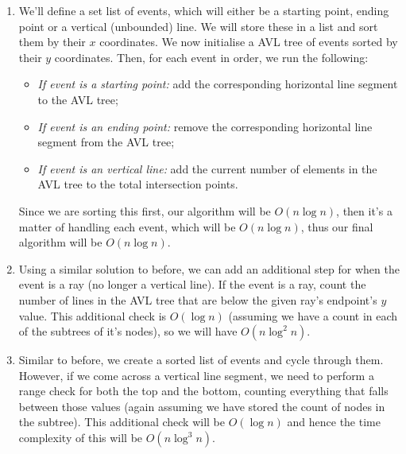 \documentclass{article}
\begin{document}
\begin{solution}
\begin{enumerate}[label = (\alph*)]
    \item We'll define a set list of events, which will either be a starting point, ending point or a vertical (unbounded) line. We will store these in a list and sort them by their $x$ coordinates. We now initialise a AVL tree of events sorted by their $y$ coordinates. Then, for each event in order, we run the following:
\begin{itemize}
  \item \textit{If event is a starting point:} add the corresponding horizontal line segment to the AVL tree;
  \item \textit{If event is an ending point:} remove the corresponding horizontal line segment from the AVL tree;
  \item \textit{If event is an vertical line:} add the current number of elements in the AVL tree to the total intersection points.
\end{itemize}

Since we are sorting this first, our algorithm will be $O(n \log n)$, then it's a matter of handling each event, which will be $O(n \log n)$, thus our final algorithm will be $O(n \log n)$.

    \item Using a similar solution to before, we can add an additional step for when the event is a ray (no longer a vertical line). If the event is a ray, count the number of lines in the AVL tree that are below the given ray's endpoint's $y$ value. This additional check is $O(\log n)$ (assuming we have a count in each of the subtrees of it's nodes), so we will have $O(n \log^2 n)$.

    \item Similar to before, we create a sorted list of events and cycle through them. However, if we come across a vertical line segment, we need to perform a range check for both the top and the bottom, counting everything that falls between those values (again assuming we have stored the count of nodes in the subtree). This additional check will be $O(\log n)$ and hence the time complexity of this will be $O(n \log^3 n)$.
\end{enumerate}
\end{solution}
\end{document}
